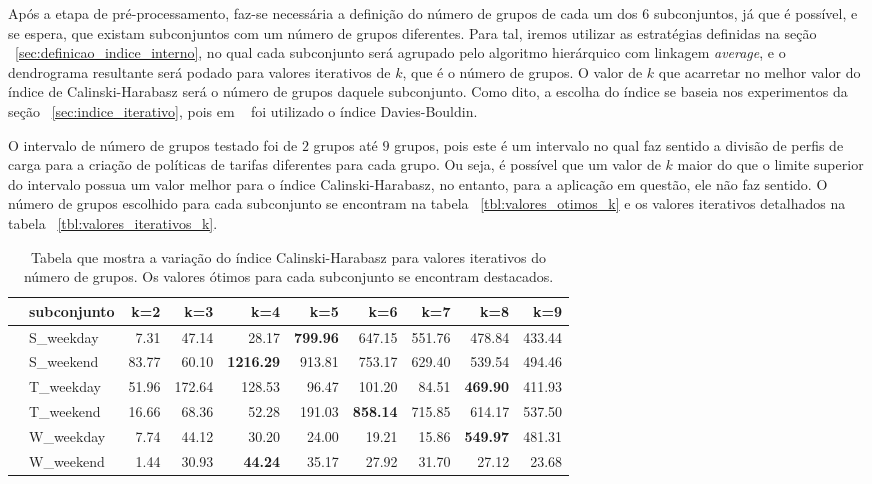 Após a etapa de pré-processamento, faz-se necessária a definição do número de grupos de cada um dos $6$ subconjuntos, já que é possível, e se espera, que existam subconjuntos com um número de grupos diferentes. Para tal, iremos utilizar as estratégias definidas na seção ~\ref{sec:definicao_indice_interno}, no qual cada subconjunto será agrupado pelo algoritmo hierárquico com linkagem \emph{average}, e o dendrograma resultante será podado para valores iterativos de $k$, que é o número de grupos. O valor de $k$ que acarretar no melhor valor do índice de Calinski-Harabasz será o número de grupos daquele subconjunto. Como dito, a escolha do índice se baseia nos experimentos da seção ~\ref{sec:indice_iterativo}, pois em ~\parencite{Flath2012} foi utilizado o índice Davies-Bouldin.

O intervalo de número de grupos testado foi de $2$ grupos até $9$ grupos, pois este é um intervalo no qual faz sentido a divisão de perfis de carga para a criação de políticas de tarifas diferentes para cada grupo. Ou seja, é possível que um valor de $k$ maior do que o limite superior do intervalo possua um valor melhor para o índice Calinski-Harabasz, no entanto, para a aplicação em questão, ele não faz sentido. O número de grupos escolhido para cada subconjunto se encontram na tabela ~\ref{tbl:valores_otimos_k} e os valores iterativos detalhados na tabela ~\ref{tbl:valores_iterativos_k}.

\begin{center}
			\begin{table}
				\caption{Tabela que mostra a variação do índice Calinski-Harabasz para valores iterativos do número de grupos. Os valores ótimos para cada subconjunto se encontram destacados. } 
		\begin{tabular}{llrrrrrrrr}
			\toprule
			{} &    subconjunto &    k=2 &     k=3 &      k=4 &     k=5 &     k=6 &     k=7 &     k=8 &     k=9 \\
			\midrule
			 &  S\_weekday &   7.31 &   47.14 &    28.17 &  \bfseries{799.96 } &  647.15 &  551.76 &  478.84 &  433.44 \\
			 &  S\_weekend &  83.77 &   60.10 &  \bfseries{1216.29} &  913.81 &  753.17 &  629.40 &  539.54 &  494.46 \\
			 &  T\_weekday &  51.96 &  172.64 &   128.53 &   96.47 &  101.20 &   84.51 &  \bfseries{469.90} &  411.93 \\
			 &  T\_weekend &  16.66 &   68.36 &    52.28 &  191.03 &  \bfseries{858.14} &  715.85 &  614.17 &  537.50 \\
			 &  W\_weekday &   7.74 &   44.12 &    30.20 &   24.00 &   19.21 &   15.86 &  \bfseries{549.97} &  481.31 \\
			 &  W\_weekend &   1.44 &   30.93 &    \bfseries{44.24} &   35.17 &   27.92 &   31.70 &   27.12 &   23.68 \\
			\bottomrule
		\end{tabular} 	
\end{table}\label{tbl:valores_iterativos_k}

\end{center}

